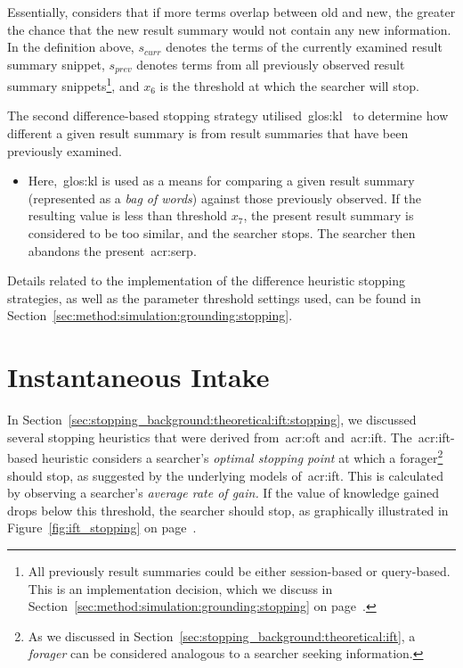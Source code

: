 Essentially,  considers that if more terms overlap between old and new, the greater the chance that the new result summary would not contain any new information. In the definition above, $s_{curr}$ denotes the terms of the currently examined result summary snippet, $s_{prev}$ denotes terms from all previously observed result summary snippets\footnote{All previously result summaries could be either session-based or query-based. This is an implementation decision, which we discuss in Section~\ref{sec:method:simulation:grounding:stopping} on page~\pageref{sec:method:simulation:grounding:stopping}.}, and $x_6$ is the threshold at which the searcher will stop.

The second difference-based stopping strategy utilised~\gls{glos:kl}~\citep{kullback1951information} to determine how different a given result summary is from result summaries that have been previously examined.

\begin{itemize}
    \item{ Here,~\gls{glos:kl} is used as a means for comparing a given result summary (represented as a \emph{bag of words}) against those previously observed. If the resulting value is less than threshold $x_7$, the present result summary is considered to be too similar, and the searcher stops. The searcher then abandons the present~\gls{acr:serp}.}
\end{itemize}

Details related to the implementation of the difference heuristic stopping strategies, as well as the parameter threshold settings used, can be found in Section~\ref{sec:method:simulation:grounding:stopping}.

\section{Instantaneous Intake}
In Section~\ref{sec:stopping_background:theoretical:ift:stopping}, we discussed several stopping heuristics that were derived from~\gls{acr:oft} and~\gls{acr:ift}. The~\gls{acr:ift}-based heuristic considers a searcher's \emph{optimal stopping point} at which a forager\footnote{As we discussed in Section~\ref{sec:stopping_background:theoretical:ift}, a \emph{forager} can be considered analogous to a searcher seeking information.} should stop, as suggested by the underlying models of~\gls{acr:ift}. This is calculated by observing a searcher's \emph{average rate of gain.} If the value of knowledge gained drops below this threshold, the searcher should stop, as graphically illustrated in Figure~\ref{fig:ift_stopping} on page~\pageref{fig:ift_stopping}.


